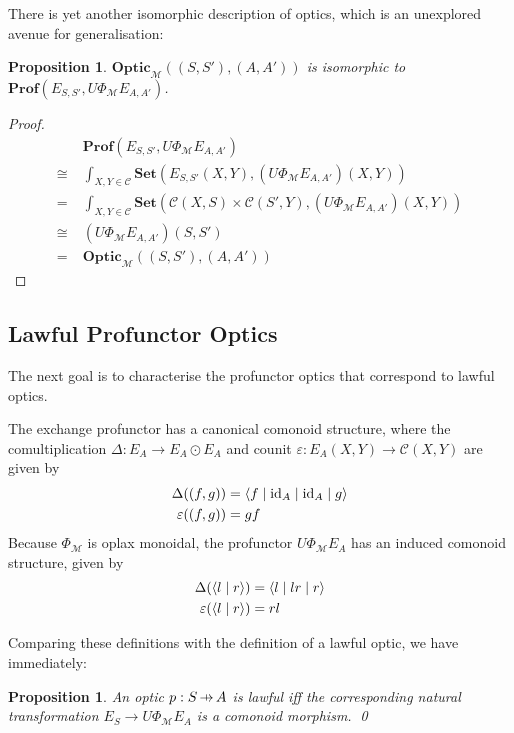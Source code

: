 \documentclass[11pt,letterpaper]{article}
\theoremstyle{plain}
\newtheorem{proposition}[theorem]{Proposition}
\theoremstyle{definition}
\newcommand{\C}{\mathscr{C}}
\newcommand{\M}{\mathscr{M}}
\newcommand{\Pastro}{\Phi}
\newcommand{\Set}{\mathbf{Set}}
\newcommand{\Prof}{\mathbf{Prof}}
\newcommand{\Optic}{\mathbf{Optic}}
\newcommand{\id}{\mathrm{id}}
\newcommand{\rep}[2]{{\ensuremath \left\langle #1 \mid #2 \right\rangle}}
\newcommand{\repthree}[3]{{\ensuremath \langle #1 \mid #2 \mid #3 \rangle}}
\newcommand{\repfour}[4]{{\ensuremath \langle #1 \mid #2 \mid #3 \mid #4 \rangle}}
\newcommand{\hto}{\ensuremath{\,\mathaccent\shortmid\rightarrow\,}}
\begin{document}
There is yet another isomorphic description of optics, which is an unexplored avenue for generalisation:

\begin{proposition}
  $\Optic_\M((S, S'), (A, A'))$ is isomorphic to $\Prof(E_{S, S'}, U \Phi_\M E_{A, A'})$.
\end{proposition}
\begin{proof}
  \begin{align*}
    &\Prof(E_{S, S'}, U \Phi_\M E_{A, A'}) \\
    \cong\;&\int_{X,Y \in \C} \Set(E_{S, S'}(X,Y), (U \Phi_\M E_{A, A'})(X,Y)) \\
    = \;&\int_{X,Y \in \C} \Set(\C(X,S) \times \C(S',Y), (U \Phi_\M E_{A, A'})(X,Y)) \\
    \cong \;& (U \Phi_\M E_{A, A'})(S,S') \\
    = \;&\Optic_\M((S, S'), (A, A'))
  \end{align*}
\end{proof}

\subsection{Lawful Profunctor Optics}

The next goal is to characterise the profunctor optics that correspond to lawful optics.

The exchange profunctor has a canonical comonoid structure, where the comultiplication $\Delta : E_A \to E_A \odot E_A$ and counit $\varepsilon : E_A(X, Y) \to \C(X, Y)$ are given by
\begin{align*}
  \Delta((f, g)) &= \repfour{f}{\id_A}{\id_A}{g}  \\
  \varepsilon((f, g)) &= gf
\end{align*}
Because $\Pastro_\M$ is oplax monoidal, the profunctor $U\Pastro_\M E_A$ has an induced comonoid structure, given by
\begin{align*}
  \Delta(\rep{l}{r}) &= \repthree{l}{lr}{r} \\
  \varepsilon(\rep{l}{r}) &= rl
\end{align*}

Comparing these definitions with the definition of a lawful optic, we have immediately:

\begin{proposition}
  An optic $p : S \hto A$ is lawful iff the corresponding natural transformation $E_S \rightarrow U \Phi_\M E_A$ is a comonoid morphism. \qed
\end{proposition}
\end{document}
